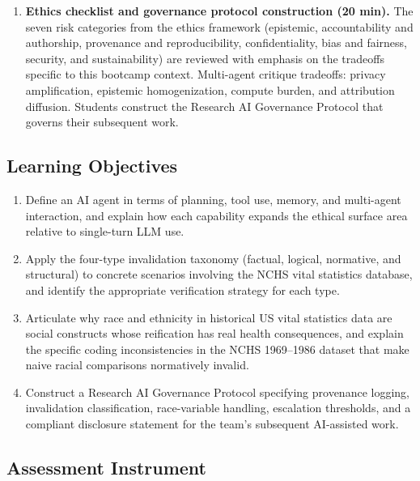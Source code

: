 \begin{enumerate}
    \item \textbf{Ethics checklist and governance protocol
    construction (20 min).} The seven risk categories from the
    ethics framework (epistemic, accountability and authorship,
    provenance and reproducibility, confidentiality, bias and
    fairness, security, and sustainability) are reviewed with
    emphasis on the tradeoffs specific to this bootcamp context.
    Multi-agent critique tradeoffs: privacy amplification, epistemic
    homogenization, compute burden, and attribution diffusion.
    Students construct the Research AI Governance Protocol that
    governs their subsequent work.
\end{enumerate}

\subsection{Learning Objectives}

\begin{enumerate}
    \item Define an AI agent in terms of planning, tool use,
    memory, and multi-agent interaction, and explain how each
    capability expands the ethical surface area relative to
    single-turn LLM use.

    \item Apply the four-type invalidation taxonomy (factual,
    logical, normative, and structural) to concrete scenarios
    involving the NCHS vital statistics database, and identify
    the appropriate verification strategy for each type.

    \item Articulate why race and ethnicity in historical US
    vital statistics data are social constructs whose reification
    has real health consequences, and explain the specific coding
    inconsistencies in the NCHS 1969--1986 dataset that make
    naive racial comparisons normatively invalid.

    \item Construct a Research AI Governance Protocol specifying
    provenance logging, invalidation classification, race-variable
    handling, escalation thresholds, and a compliant disclosure
    statement for the team's subsequent AI-assisted work.
\end{enumerate}

\subsection{Assessment Instrument}

